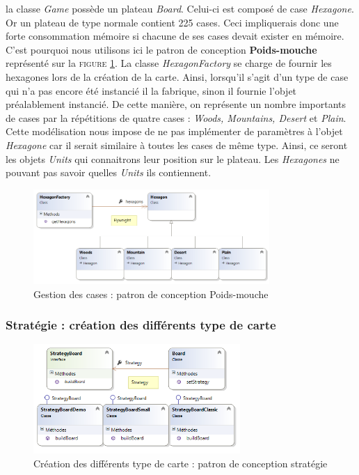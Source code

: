		la classe \emph{Game} possède un plateau \emph{Board}. Celui-ci est composé de case \emph{Hexagone}. Or un plateau de type normale contient 225 cases. Ceci impliquerais donc une forte consommation mémoire si chacune de ses cases devait exister en mémoire. C'est pourquoi nous utilisons ici le patron de conception \textbf{Poids-mouche} représenté sur la \textsc{figure} \ref{fig:flyweight}. La classe \emph{HexagonFactory} se charge de fournir les hexagones lors de la création de la carte. Ainsi, lorsqu'il s'agit d'un type de case qui n'a pas encore été instancié il la fabrique, sinon il fournie l'objet préalablement instancié. De cette manière, on représente un nombre importants de cases par la répétitions de quatre cases : \emph{Woods, Mountains, Desert} et \emph{Plain}. Cette modélisation nous impose de ne pas implémenter de paramètres à l'objet \emph{Hexagone} car il serait similaire à toutes les cases de même type. Ainsi, ce seront les objets \emph{Units} qui connaitrons leur position sur le plateau. Les \emph{Hexagones} ne pouvant pas savoir quelles \emph{Units} ils contiennent.

		\begin{figure}
			\begin{center}
				\includegraphics[width=0.8\textwidth]{figure/flyweight.png}
			\end{center}
			\caption{Gestion des cases : patron de conception Poids-mouche}
			\label{fig:flyweight}
		\end{figure}


		\subsubsection{Stratégie : création des différents type de carte}


		\begin{figure}
			\begin{center}
				\includegraphics[width=0.7\textwidth]{figure/strategy.png}
			\end{center}
			\caption{Création des différents type de carte : patron de conception stratégie }
			\label{fig:strategy}
		\end{figure}

